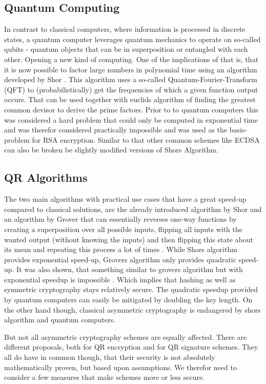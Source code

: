 \documentclass[conference]{IEEEtran}
\begin{document}
\subsection{Quantum Computing}\label{l:quantum_computing}
In contrast to classical computers, where information is processed in discrete states, a quantum computer leverages quantum mechanics to operate on so-called qubits - quantum objects that can be in superposition or entangled with each other. 
Opening a new kind of computing. 
One of the implications of that is, that it is now possible to factor large numbers in polynomial time using an algorithm developed by Shor \cite{Shor}. 
This algorithm uses a so-called Quantum-Fourier-Transform (QFT) to (probabilistically) get the frequencies of which a given function output occurs. That can be used together with euclids algorithm of finding the greatest common devisor to derive the prime factors. 
Prior to to quantum computers this was considered a hard problem that could only be computed in exponential time and was therefor considered practically impossible and was used as the basis-problem for RSA encryption.
Similar to that other common schemes like ECDSA can also be broken be slightly modified versions of Shors Algorithm.
\subsection{QR Algorithms}\label{l:qr-algs}
The two main algorithms with practical use cases that have a great speed-up compared to classical solutions, are the already introduced algorithm by Shor and an algorithm by Grover that can essentially reverses one-way functions by creating a superposition over all possible inputs, flipping all inputs with the wanted output (without knowing the inputs) and then flipping this state about its mean and repeating this process a lot of times \cite{Grover}.
While Shors algorithm provides exponential speed-up, Grovers algorithm only provides quadratic speed-up. It was also shown, that something similar to grovers algorithm but with exponential speedup is impossible \cite{Strengths&Weaknesses_QC}. 
Which implies that hashing as well as symmetric cryptography stays relatively secure.
The quadratic speedup provided by quantum computers can easily be mitigated by doubling the key length.
On the other hand though, classical asymmetric cryptography is endangered by shors algorithm and quantum computers.

But not all asymmetric cryptography schemes are equally affected.
There are different proposals, both for QR encryption and for QR signature schemes.
They all do have in common though, that their security is not absolutely mathematically proven, but based upon assumptions.
We therefor need to consider a few measures that make schemes more or less secure.
\end{document}
